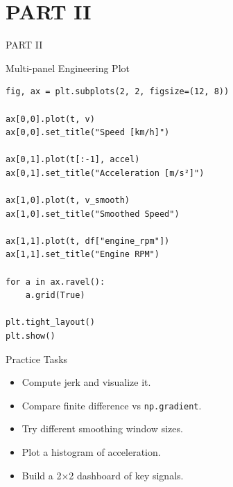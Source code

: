 \documentclass[aspectratio=169]{beamer}
\begin{document}
\section{PART II}
\begin{frame}[plain]
  \begin{center}
    \vspace{2cm}
    {\color{white}\Huge PART II}
  \end{center}
\end{frame}

\begin{frame}[fragile]{Multi-panel Engineering Plot}
\begin{verbatim}
fig, ax = plt.subplots(2, 2, figsize=(12, 8))

ax[0,0].plot(t, v)
ax[0,0].set_title("Speed [km/h]")

ax[0,1].plot(t[:-1], accel)
ax[0,1].set_title("Acceleration [m/s²]")

ax[1,0].plot(t, v_smooth)
ax[1,0].set_title("Smoothed Speed")

ax[1,1].plot(t, df["engine_rpm"])
ax[1,1].set_title("Engine RPM")

for a in ax.ravel():
    a.grid(True)

plt.tight_layout()
plt.show()
\end{verbatim}
\end{frame}

\begin{frame}{Practice Tasks}
  \begin{itemize}
    \item Compute jerk and visualize it.
    \item Compare finite difference vs \texttt{np.gradient}.
    \item Try different smoothing window sizes.
    \item Plot a histogram of acceleration.
    \item Build a 2×2 dashboard of key signals.
  \end{itemize}
\end{frame}

\end{document}
